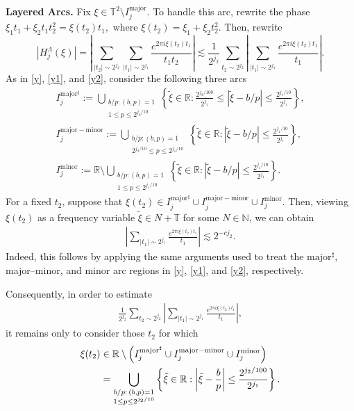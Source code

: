 \documentclass[10pt,a4paper]{amsart}
\numberwithin{equation}{section}
\begin{document}
\noindent\textbf{Layered Arcs.}
Fix $\xi\in
\mathbb{T}^2 \setminus I^{\mathrm{major}}_{j}.$ To handle this arc, rewrite the phase
$\xi_{1} t_1+\xi_{2} t_1t_2^2=\xi(t_2)t_1,$ where $\xi(t_2)=\xi_{1}+\xi_{2}t_2^2.$ Then, rewrite $$|H^{\Lambda}_{j}(\xi)|=\left|\sum_{|t_2|\sim 2^{j_2}}\sum_{|t_1|\sim 2^{j_1}}\frac{e^{2\pi i\xi(t_2)t_1}}{t_1t_2}\right|\lesssim \frac{1}{2^{j_2}}\sum_{t_2\sim 2^{j_2}}\left|\sum_{|t_1|\sim 2^{j_1}}\frac{e^{2\pi i\xi(t_2)t_1}}{t_1}\right|.$$ As in \eqref{y}, \eqref{y1}, and \eqref{y2}, consider the following three arcs \begin{align*}
I^{\mathrm{major^{\sharp}}}_{j}:= 	\bigcup_{\substack{b/p : (b,p)=1 \\ 1\le p \le 2^{j_2/10}}}
	\left\{
	\tilde{\xi} \in \mathbb{R} : \frac{2^{j_2/100}}{2^{j_1}}\le
	|\tilde{\xi} - b/p| \le \frac{2^{j_1/10}}{2^{j_1}}
	\right\},\\
I^{\mathrm{major-minor}}_{j}:=	\bigcup_{\substack{b/p : (b,p)=1 \\ 2^{j_2/10}\le p \le 2^{j_1/10}}}
	\left\{
	\tilde{\xi} \in \mathbb{R} :
	|\tilde{\xi} - b/p| \le \frac{2^{j_1/10}}{2^{j_1}}
	\right\},\\
 I^{\mathrm{minor}}_{j}:=	\mathbb{R}\setminus
	\bigcup_{\substack{b/p : (b,p)=1 \\ 1\le p \le 2^{j_1/10}}}
	\left\{
	\tilde{\xi} \in \mathbb{R} :
	|\tilde{\xi} - b/p| \le \frac{2^{j_1/10}}{2^{j_1}}
	\right\}.
\end{align*}  For a fixed  $t_2$, suppose that $\xi(t_2)\in I^{\mathrm{major^{\sharp}}}_{j}\cup I^{\mathrm{major-minor}}_{j}\cup   I^{\mathrm{minor}}_{j}.$ Then, viewing $\xi(t_2)$ as a frequency variable $\widetilde{\xi}\in N+\mathbb{T}$ for some $N\in\mathbb{N}$, 
we can obtain
\begin{align}\label{y77}
\left|
\sum_{|t_1|\sim 2^{j_1}}
\frac{e^{2\pi i \xi(t_2)t_1}}{t_1}
\right|
\lesssim 2^{-c j_2}.
\end{align}
Indeed, this follows by applying the same arguments used to treat the $\mathrm{major}^{\sharp}$, major--minor, and minor arc regions in \eqref{y}, \eqref{y1}, and \eqref{y2}, respectively.

Consequently, in order to estimate 
\begin{align*} \frac{1}{2^{j_2}} \sum_{t_2\sim 2^{j_2}} \left| \sum_{|t_1|\sim 2^{j_1}} \frac{e^{2\pi i \xi(t_2)t_1}}{t_1} \right|, 
\end{align*} 
it remains only to consider those $t_2$ for which 
\begin{align*} \xi(t_2) &\in \mathbb{R}\setminus \Bigl(  I^{\mathrm{major^{\sharp}}}_{j}\cup I^{\mathrm{major-minor}}_{j}\cup   I^{\mathrm{minor}}_{j} \Bigr) \\ &= \bigcup_{\substack{b/p:\,(b,p)=1\\ 1\le p\le 2^{j_2/10}}} \left\{ \tilde{\xi}\in\mathbb{R}: \left|\tilde{\xi}-\frac{b}{p}\right| \le \frac{2^{j_2/100}}{2^{j_1}} \right\}. 
\end{align*}
\end{document}
